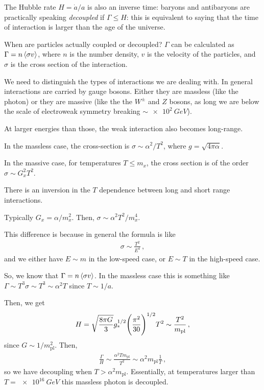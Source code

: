 \documentclass[main.tex]{subfiles}
\begin{document}
The Hubble rate \(H = \dot{a} / a \) is also an inverse time: baryons and antibaryons are practically speaking \emph{decoupled} if \(\Gamma \leq H\): this is equivalent to saying that the time of interaction is larger than the age of the universe.

When are particles actually coupled or decoupled?
\(\Gamma \) can be calculated as \(\Gamma = n \expval{\sigma v}\), where \(n\) is the number density, \(v\) is the velocity of the particles, and \(\sigma \) is the cross section of the interaction.

We need to distinguish the types of interactions we are dealing with.
In general interactions are carried by gauge bosons. 
Either they are massless (like the photon) or they are massive (like the the \(W^{\pm}\) and \(Z\) bosons, as long we are below the scale of electroweak symmetry breaking \(\sim \SI{e2}{GeV}\)).

At larger energies than those, the weak interaction also becomes long-range.

In the massless case, the cross-section is \(\sigma \sim \alpha^2 / T^2\), where \(g = \sqrt{4 \pi \alpha }\).

In the massive case, for temperatures \(T \leq m_{x}\), the cross section is of the order \(\sigma \sim G_x^2 T^2\).

There is an inversion in the \(T\) dependence between long and short range interactions.

Typically \(G_x = \alpha / m_x^2\).  Then, \(\sigma \sim \alpha^2 T^2 / m_x^{4}\).

This difference is because in general the formula is like 
%
\begin{align}
  \sigma \sim \frac{T^{2}}{E^{4}}
\,,
\end{align}
%
and we either have \(E \sim m\) in the low-speed case, or \(E \sim T\) in the high-speed case.

So, we know that \(\Gamma = n \expval{\sigma v}\). In the massless case this is something like \(\Gamma \sim T^3 \sigma \sim T^{3} \sim \alpha^2 T\) since \(T \sim 1/ a\).

Then, we get 
%
\begin{align}
  H = \sqrt{\frac{8 \pi G }{3}} g_{*}^{1/2} \qty(\frac{\pi^2}{30})^{1/2} T^2 \sim \frac{T^2}{m _{\text{pl}}}
\,,
\end{align}
%
since \(G \sim 1/m _{\text{pl}}^2\). Then, 
%
\begin{align}
  \frac{\Gamma}{H} \sim \frac{\alpha^2 T m _{\text{pl}}}{T^2} \sim \alpha^2 m _{\text{pl}} \frac{1}{T}
\,,
\end{align}
%
so we have decoupling when \(T > \alpha^2 m _{\text{pl}}\).
Essentially, at temperatures larger than \(T = \SI{e16}{GeV}\) this massless photon is decoupled.
\end{document}
